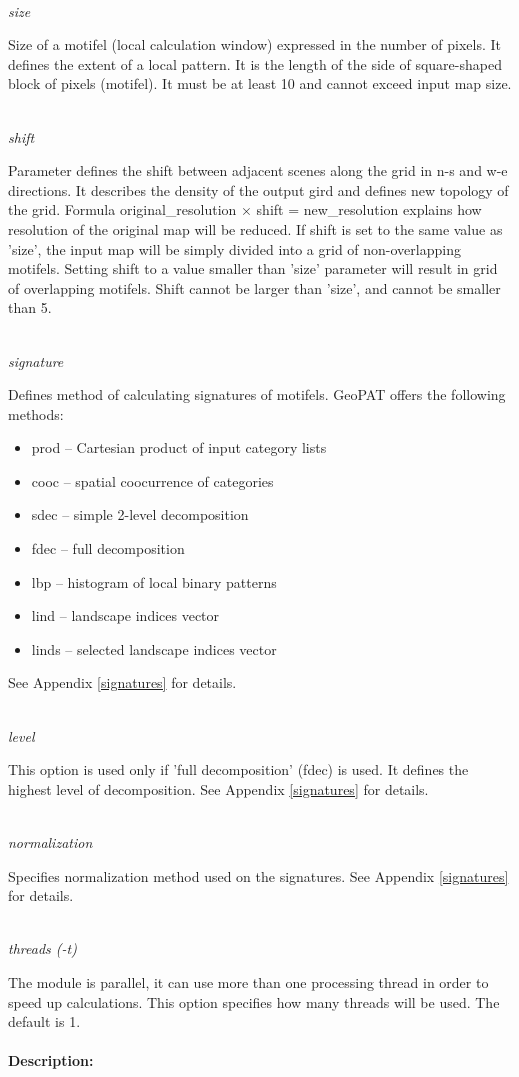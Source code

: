 \documentclass[12pt,margin=0.5in]{article}
\newcommand{\newoption}[1]{\mbox{}\\{\it #1}}
\begin{document}
\newoption{size}

Size of a motifel (local calculation window) expressed in the number of pixels. It defines the extent of a local pattern. It is the length of the side of square-shaped block of pixels (motifel). It must be at least 10 and cannot exceed input map size.

\newoption{shift}

Parameter defines the shift between adjacent scenes along the grid in n-s and w-e directions. It describes the density of the output gird and defines new topology of the grid. Formula original\_resolution $\times$ shift = new\_resolution explains how resolution of the original map will be reduced. If shift is set to the same value as 'size', the input map will be simply divided into a grid of non-overlapping motifels. Setting shift to a value smaller than 'size' parameter will result in grid of overlapping motifels. Shift cannot be larger than 'size', and cannot be smaller than 5.

\newoption{signature}

Defines method of calculating signatures of motifels. GeoPAT offers the following methods: 
\begin{itemize}
	\item prod -- Cartesian product of input category lists
	\item cooc -- spatial coocurrence of categories
	\item sdec -- simple 2-level decomposition
	\item fdec -- full decomposition
	\item lbp -- histogram of local binary patterns
	\item lind -- landscape indices vector
	\item linds -- selected landscape indices vector
\end{itemize}
See Appendix \ref{signatures} for details.

\newoption{level}

This option is used only if 'full decomposition' (fdec) is used. It defines the highest level of decomposition. See Appendix \ref{signatures} for details.

\newoption{normalization}

Specifies normalization method used on the signatures. See Appendix \ref{signatures} for details.

\newoption{threads (-t)}

The module is parallel, it can use more than one processing thread in order to speed up calculations. This option specifies how many threads will be used. The default is 1.
\\\\
{\bf Description:}
\end{document}
